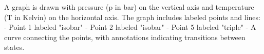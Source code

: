 A graph is drawn with pressure (p in bar) on the vertical axis and temperature (T in Kelvin) on the horizontal axis. The graph includes labeled points and lines:  
- Point 1 labeled "isobar"  
- Point 2 labeled "isobar"  
- Point 5 labeled "triple"  
- A curve connecting the points, with annotations indicating transitions between states.